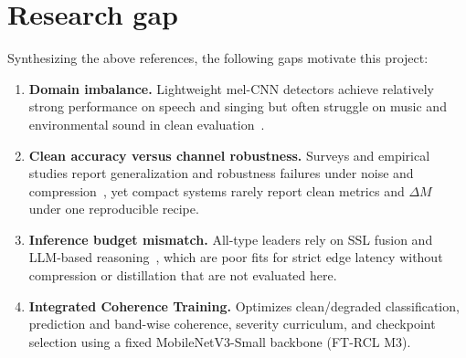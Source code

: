\section{Research gap}

Synthesizing the above references, the following gaps motivate this project:

\begin{enumerate}
  \item \textbf{Domain imbalance.} Lightweight mel-CNN detectors achieve relatively strong performance on speech and singing but often struggle on music and environmental sound in clean evaluation~\cite{xie2026atadd,xie2024fakesound,alnaqbi2026systematic}.
  \item \textbf{Clean accuracy versus channel robustness.} Surveys and empirical studies report generalization and robustness failures under noise and compression~\cite{nguyenle2026deepfakeSurvey,zhang2025sensorsSurvey,gao2024p2v}, yet compact systems rarely report clean metrics and $\Delta M$ under one reproducible recipe.
  \item \textbf{Inference budget mismatch.} All-type leaders rely on SSL fusion and LLM-based reasoning~\cite{fan2026dualssl,xie2026ftgrpo,gu2024allm4add}, which are poor fits for strict edge latency without compression or distillation that are not evaluated here.
  \item \textbf{Integrated Coherence Training.} Optimizes clean/degraded classification, prediction and band-wise coherence, severity curriculum, and checkpoint selection using a fixed MobileNetV3-Small backbone (FT-RCL M3).
\end{enumerate}
